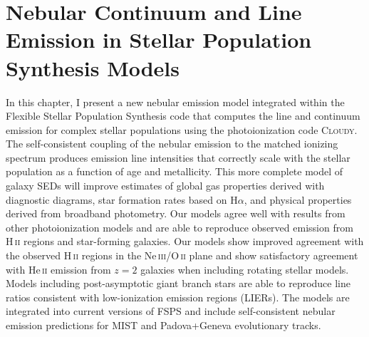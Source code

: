 %
%
%
%
%
%


\chapter{Nebular Continuum and Line Emission in Stellar Population Synthesis Models}
\label{ch:model}


In this chapter, I present a new nebular emission model integrated within the Flexible Stellar Population Synthesis code that computes the line and continuum emission for complex stellar populations using the photoionization code \textsc{Cloudy}. The self-consistent coupling of the nebular emission to the matched ionizing spectrum produces emission line intensities that correctly scale with the stellar population as a function of age and metallicity. This more complete model of galaxy SEDs will improve estimates of global gas properties derived with diagnostic diagrams, star formation rates based on H$\alpha$, and physical properties derived from broadband photometry. Our models agree well with results from other photoionization models and are able to reproduce observed emission from H\,\textsc{ii} regions and star-forming galaxies. Our models show improved agreement with the observed H\,\textsc{ii} regions in the Ne\,\textsc{iii}/O\,\textsc{ii} plane and show satisfactory agreement with He\,\textsc{ii} emission from $z=2$ galaxies when including rotating stellar models. Models including post-asymptotic giant branch stars are able to reproduce line ratios consistent with low-ionization emission regions (LIERs). The models are integrated into current versions of \textsc{FSPS} and include self-consistent nebular emission predictions for MIST and Padova+Geneva evolutionary tracks.

